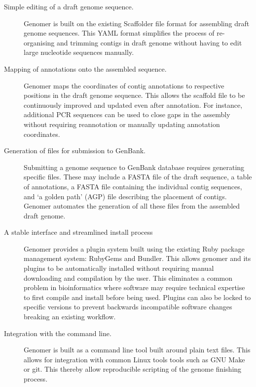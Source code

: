 \documentclass[10pt]{article}
\begin{document}
\begin{description} 

  \item[Simple editing of a draft genome sequence.]{Genomer is built on the
  existing Scaffolder \cite{barton2012} file format for assembling draft genome
  sequences. This YAML format simplifies the process of re-organising and
  trimming contigs in draft genome without having to edit large nucleotide
  sequences manually.}

  \item[Mapping of annotations onto the assembled sequence.]{Genomer maps the
  coordinates of contig annotations to respective positions in the draft genome
  sequence. This allows the scaffold file to be continuously improved and
  updated even after annotation. For instance, additional PCR sequences can be
  used to close gaps in the assembly without requiring reannotation or manually
  updating annotation coordinates.}

  \item[Generation of files for submission to GenBank.]{Submitting a genome
  sequence to GenBank database requires generating specific files. These may
  include a FASTA file of the draft sequence, a table of annotations, a FASTA
  file containing the individual contig sequences, and `a golden path' (AGP)
  \cite{agp-spec} file describing the placement of contigs. Genomer automates
  the generation of all these files from the assembled draft genome.}

  \item[A stable interface and streamlined install process]{Genomer provides a
  plugin system built using the existing Ruby package management system:
  RubyGems and Bundler. This allows genomer and its plugins to be automatically
  installed without requiring manual downloading and compilation by the user.
  This eliminates a common problem in bioinformatics where software may require
  technical expertise to first compile and install before being used. Plugins
  can also be locked to specific versions to prevent backwards incompatible
  software changes breaking an existing workflow.}

  \item[Integration with the command line.]{Genomer is built as a command line
  tool built around plain text files. This allows for integration with common
  Linux tools tools such as GNU Make or git. This thereby allow reproducible
  scripting of the genome finishing process.}

\end{description}
\end{document}
